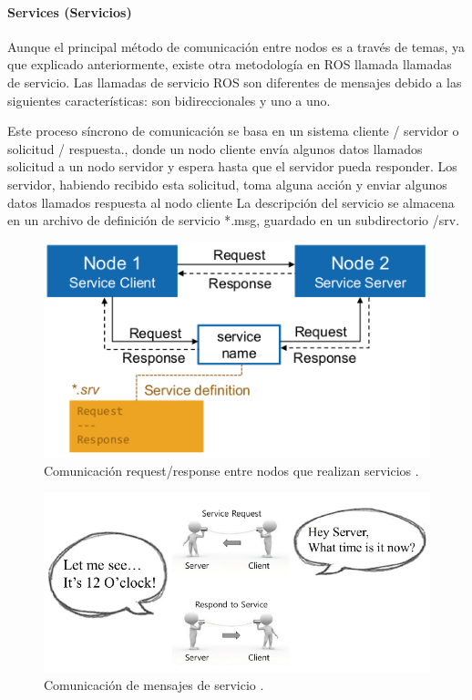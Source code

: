                \newpage


            \paragraph{Services (Servicios)}
                 Aunque el principal método de comunicación entre nodos es a través de temas, ya que explicado anteriormente, existe otra metodología en ROS llamada llamadas de servicio. Las llamadas de servicio ROS son diferentes de mensajes debido a las siguientes características: son bidireccionales y uno a uno. 
                 
                Este proceso síncrono de comunicación se basa en un sistema cliente / servidor o solicitud / respuesta., donde un nodo cliente envía algunos datos llamados solicitud a un nodo servidor y espera hasta que el servidor pueda responder. Los servidor, habiendo recibido esta solicitud, toma alguna acción  y enviar algunos datos llamados respuesta al nodo cliente
                La descripción del servicio se almacena en un archivo de definición de servicio *.msg, guardado en un subdirectorio /srv. 

            \begin{figure}[htb]
                \centering
                \includegraphics[width=0.85\linewidth]{Main/Chapter3/Images3/n_s_a_9.png}
                \caption{Comunicación request/response entre nodos que realizan servicios \cite{rosmaster_diagram}.}
                \label{f:Cap3_conceptos_9}
            \end{figure} 
            
            \begin{figure}[htb]
                \centering
                \includegraphics[width=1.0\linewidth]{Main/Chapter3/Images3/n_s_a_10.PNG}
                \caption{Comunicación de mensajes de servicio \cite{ROS_BOOK_1}.}
                \label{f:Cap3_conceptos_10}
            \end{figure}             


